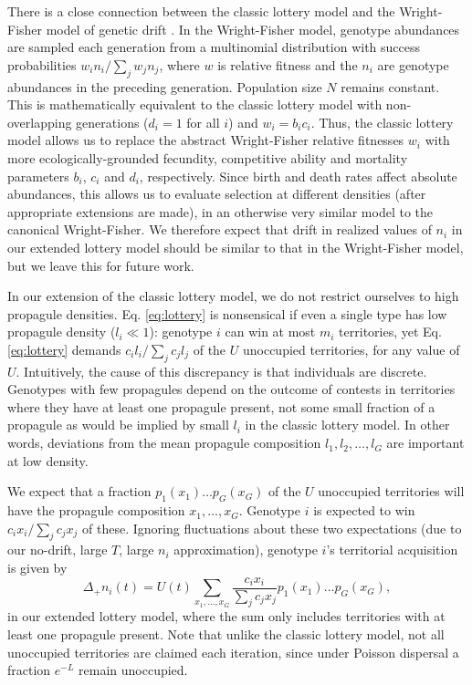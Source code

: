 \documentclass[11pt]{article}
\begin{document}
There is a close connection between the classic lottery model and the Wright-Fisher model of genetic drift \citep{svardal_2015}. In the Wright-Fisher model, genotype abundances are sampled each generation from a multinomial distribution with success probabilities $w_i n_i/\sum_j w_j n_j$, where $w$ is relative fitness and the $n_i$ are  genotype abundances in the preceding generation. Population size $N$ remains constant. This is mathematically equivalent to the classic lottery model with non-overlapping generations ($d_i=1$ for all $i$) and $w_i=b_i c_i$. Thus, the classic lottery model allows us to replace the abstract Wright-Fisher relative fitnesses $w_i$ with more ecologically-grounded fecundity, competitive ability and mortality parameters $b_i$, $c_i$ and $d_i$, respectively. Since birth and death rates affect absolute abundances, this allows us to evaluate selection at different densities (after appropriate extensions are made), in an otherwise very similar model to the canonical Wright-Fisher. We therefore expect that drift in realized values of $n_i$ in our extended lottery model should be similar to that in the Wright-Fisher model, but we leave this for future work. 

In our extension of the classic lottery model, we do not restrict ourselves to high propagule densities. Eq. \eqref{eq:lottery} is nonsensical if even a single type has low propagule density ($l_i\ll 1$): genotype $i$ can win at most $m_i$ territories, yet Eq. \eqref{eq:lottery} demands $c_i l_i/\sum_j c_j l_j$ of the $U$ unoccupied territories, for any value of $U$. Intuitively, the cause of this discrepancy is that individuals are discrete. Genotypes with few propagules depend on the outcome of contests in territories where they have at least one propagule present, not some small fraction of a propagule as would be implied by small $l_i$ in the classic lottery model. In other words, deviations from the mean propagule composition $l_1,l_2,\ldots,l_G$ are important at low density. 

We expect that a fraction $p_1(x_1)\ldots p_G(x_G)$ of the $U$ unoccupied territories will have the propagule composition $x_1,\ldots,x_G$. Genotype $i$ is expected to win $c_i x_i/\sum_j c_j x_j$ of these. Ignoring fluctuations about these two expectations (due to our no-drift, large $T$, large $n_i$ approximation), genotype $i$'s territorial acquisition is given by
\begin{equation}
\Delta_+ n_i(t)=U(t)\sum_{x_1,\ldots,x_G} \frac{c_i x_i}{\sum_j c_j x_j} p_1(x_1)\ldots p_G(x_G), \label{eq:growthsumuncoupled}
\end{equation}
in our extended lottery model, where the sum only includes territories with at least one propagule present. Note that unlike the classic lottery model, not all unoccupied territories are claimed each iteration, since under Poisson dispersal a fraction $e^{-L}$ remain unoccupied.
\end{document}
